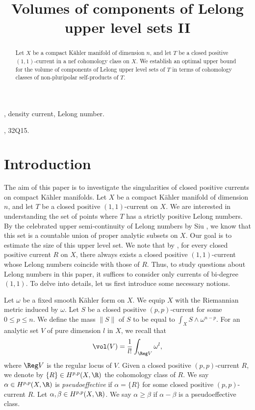 
\title{\bf Volumes of components of Lelong upper level sets II}
\maketitle
\begin{abstract} 
    Let $X$ be a compact K\"ahler manifold of dimension $n$, and let $T$ be a closed positive $(1,1)$-current in a nef cohomology class on $X$. We establish an optimal upper bound for the volume of components of Lelong upper level sets of $T$ in terms of cohomology classes of non-pluripolar self-products of $T$.
\end{abstract}
\noindent
{}, {density current}, {Lelong number}.
\\

\noindent
\subject{32U15}, {32Q15}.

\section{Introduction}


    The aim of this paper is to investigate the singularities of closed positive currents on compact K\"ahler manifolds.  Let $X$ be a compact K\"ahler manifold of dimension $n$, and let $T$ be a closed positive $(1,1)$-current on $X$. We are interested in understanding the set of points where $T$ has a strictly positive Lelong numbers. By the celebrated upper semi-continuity of Lelong numbers by Siu \cite{Siu}, we know that this set is a countable union of proper analytic subsets on $X$.  Our goal is to estimate the size of this upper level set. We  note that by \cite{Vigny-LelongSkoda}, for every closed positive current $R$ on $X$, there always exists a closed positive $(1,1)$-current whose Lelong numbers coincide with those of $R$. Thus, to study questions about Lelong numbers in this paper, it suffices to consider only currents of bi-degree $(1,1)$. To delve into details, let us first introduce some necessary notions. 

    Let $\omega$ be a fixed smooth K\"ahler form on $X$. We equip $X$ with the Riemannian metric induced by $\omega$. Let $S$ be a closed positive $(p,p)$-current for some $0 \le p \le n$. We define the mass $\|S\|$ of $S$ to be equal to $\int_{X} S \wedge \omega^{n-p}$. For an analytic set $V$ of pure dimension $l$ in $X$, we recall that  
    \[
        \vol(V) =  
        \frac{1}{l !} \int_{\Reg V} \omega^{l},
    \]
    where $\Reg V$ is the regular locus of $V$. Given a closed positive $(p,p)$-current $R$, we denote by $\{R\}  \in H^{p,p}(X,\R)$ the cohomology class of $R$. We say $\alpha \in H^{p,p}(X,\R)$ is \emph{pseudoeffective} if $\alpha =\{R\}$ for some closed positive $(p,p)$-current $R$. Let $\alpha,\beta \in H^{p,p}(X,\R)$. We say $\alpha \geq \beta$ if $\alpha-\beta$ is a pseudoeffective class. 
    
